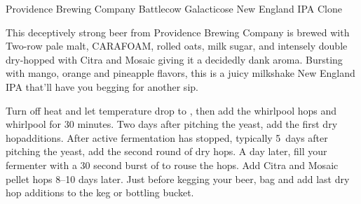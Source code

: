 \begin{recipie}{Providence Brewing Company Battlecow Galacticose New England IPA Clone}

\begin{aboutblock}
This deceptively strong beer from Providence Brewing Company is brewed with
Two-row pale malt, CARA\-FOAM, rolled oats, milk sugar, and intensely double
dry-hopped with Citra and Mosaic giving it a decidedly dank aroma. Bursting
with mango, orange and pineapple flavors, this is a juicy milkshake New England
IPA that'll have you begging for another sip. \sourceaha
\end{aboutblock}


\begin{methodandtiming}
 
\begin{mashsteps}
\end{mashsteps}

\begin{fermentationsteps}
\end{fermentationsteps}

\begin{directions}
Turn off heat and let temperature drop to , then add the whirlpool
hops and whirlpool for 30 minutes. Two days after pitching the yeast, add the
first dry hopadditions. After active fermentation has stopped, typically 5~days
after pitching the yeast, add the second round of dry hops. A day later, fill your
fermenter with a 30 second burst of  to rouse the hops. Add 
Citra and  Mosaic pellet hops 8--10 days later. Just before kegging
your beer, bag and add last dry hop additions to the keg or bottling bucket.
\end{directions}

\end{methodandtiming}

\pagebreak

\begin{ingredientsblock}

\begin{malts}
\end{malts}


\end{ingredientsblock}
\end{recipie}

